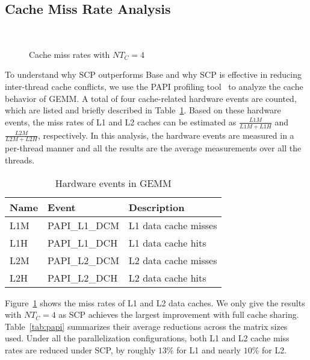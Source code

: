 \subsection{Cache Miss Rate Analysis}\label{subsec:analysis}

\begin{figure}
  \centering
  \\
  \caption{Cache miss rates with $NT_C=4$}
  \label{fig:papi}
\end{figure}

To understand why SCP outperforms Base and
why SCP is effective in reducing
inter-thread cache conflicts, 
we use the PAPI profiling tool~\cite{papi} to
analyze the cache behavior of GEMM. A total of 
four cache-related hardware events are counted,
which are listed and briefly described in Table~\ref{tab:events}.
Based on these hardware events, the
miss rates of L1 and L2 caches can be estimated  as 
$\frac{L1M}{L1M+L1H}$ and $\frac{L2M}{L2M+L2H}$, respectively.
In this analysis,
the hardware events are measured in a per-thread manner
and all the results are the average measurements
over all the threads.

\begin{table}
  \centering
  \caption{Hardware events in GEMM}
  \label{tab:events}
  \begin{tabular}{lll}
    \toprule
    Name & Event & Description \\
    \midrule
    L1M & PAPI\_L1\_DCM & L1 data cache misses \\
    L1H & PAPI\_L1\_DCH & L1 data cache hits \\
    L2M & PAPI\_L2\_DCM & L2 data cache misses \\
    L2H & PAPI\_L2\_DCH & L2 data cache hits \\
    \bottomrule
  \end{tabular}
\end{table}

Figure~\ref{fig:papi} shows the miss rates of L1 and L2 data caches.
We only give the results with $NT_C=4$
as SCP achieves the largest improvement with full cache sharing.
Table~\ref{tab:papi} summarizes their
average reductions across the matrix sizes used.
Under all the parallelization configurations,
both L1 and L2 cache miss rates are reduced under SCP, 
by roughly $13\%$ for L1 and nearly $10\%$ for L2.

